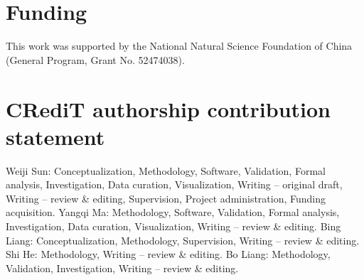 \documentclass[preprint,12pt,authoryear]{elsarticle}
\begin{document}
\section*{Funding}

This work was supported by the National Natural Science Foundation of China (General Program, Grant No. 52474038).

\section*{CRediT authorship contribution statement}

Weiji Sun: Conceptualization, Methodology, Software, Validation, Formal analysis, Investigation, Data curation, Visualization, Writing -- original draft, Writing -- review \& editing, Supervision, Project administration, Funding acquisition. Yangqi Ma: Methodology, Software, Validation, Formal analysis, Investigation, Data curation, Visualization, Writing -- review \& editing. Bing Liang: Conceptualization, Methodology, Supervision, Writing -- review \& editing. Shi He: Methodology, Writing -- review \& editing. Bo Liang: Methodology, Validation, Investigation, Writing -- review \& editing.



\end{document}
